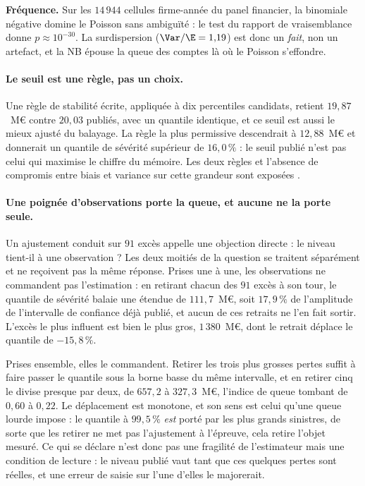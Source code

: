 \textbf{Fréquence.} Sur les $14\,944$ cellules firme-année du panel financier, la binomiale
négative domine le Poisson sans ambiguïté : le test du rapport de vraisemblance donne
$p\approx 10^{-30}$. La surdispersion ($\Var/\E=1{,}19$) est donc un \emph{fait}, non un
artefact, et la NB épouse la queue des comptes là où le Poisson s'effondre.


\paragraph{Le seuil est une règle, pas un choix.} Une règle de stabilité écrite, appliquée à dix
percentiles candidats, retient $19{,}87$~M\euro{} contre $20{,}03$ publiés, avec un quantile
identique, et ce seuil est aussi le mieux ajusté du balayage. La règle la plus permissive
descendrait à $12{,}88$~M\euro{} et donnerait un quantile de sévérité supérieur de $16{,}0\,\%$ :
le seuil publié n'est pas celui qui maximise le chiffre du mémoire. Les deux règles et l'absence
de compromis entre biais et variance sur cette grandeur sont exposées \matcomp.

\paragraph{Une poignée d'observations porte la queue, et aucune ne la porte seule.} Un
ajustement conduit sur $91$ excès appelle une objection directe : le niveau tient-il à une
observation ? Les deux moitiés de la question se traitent séparément et ne reçoivent pas la
même réponse. Prises une à une, les observations ne commandent pas l'estimation : en retirant
chacun des $91$ excès à son tour, le quantile de sévérité balaie une étendue de
$111{,}7$~M\euro, soit $17{,}9\,\%$ de l'amplitude de l'intervalle de confiance déjà publié, et
aucun de ces retraits ne l'en fait sortir. L'excès le plus influent est bien le plus gros,
$1\,380$~M\euro, dont le retrait déplace le quantile de $-15{,}8\,\%$.

Prises ensemble, elles le commandent. Retirer les trois plus grosses pertes suffit à faire
passer le quantile sous la borne basse du même intervalle, et en retirer cinq le divise presque
par deux, de $657{,}2$ à $327{,}3$~M\euro, l'indice de queue tombant de $0{,}60$ à $0{,}22$. Le
déplacement est monotone, et son sens est celui qu'une queue lourde impose : le quantile à
$99{,}5\,\%$ \emph{est} porté par les plus grands sinistres, de sorte que les retirer ne met pas
l'ajustement à l'épreuve, cela retire l'objet mesuré. Ce qui se déclare n'est donc pas une
fragilité de l'estimateur mais une condition de lecture : le niveau publié vaut tant que ces
quelques pertes sont réelles, et une erreur de saisie sur l'une d'elles le majorerait.

